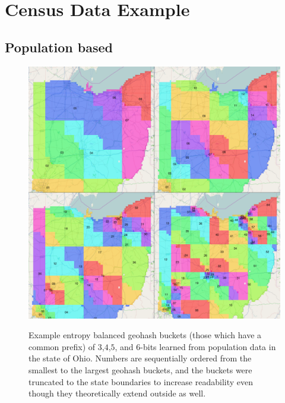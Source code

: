 \documentclass[nips13submit_09,times,art10]{article} %
\begin{document}
\section{Census Data Example}  \label{sec:census}

\subsection{Population based}

\begin{figure}
\centering
\includegraphics[width=\textwidth]{fig02}
\label{fig:hash}
\caption{Example entropy balanced geohash buckets (those which have a common prefix)
of $3$,$4$,$5$, and $6$-bits learned from population data in the state of Ohio.
Numbers are sequentially ordered from the smallest to the largest geohash buckets,
and the buckets were truncated to the state boundaries to increase readability
even though they theoretically extend outside as well.}
\end{figure}
\end{document}
